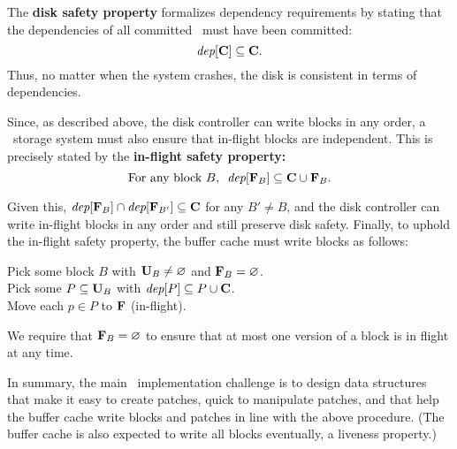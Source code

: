 The \textbf{disk safety property} formalizes dependency requirements by
 stating that the dependencies of all committed \patches\ must have been
 committed:
%
\[ \PDepset{\PDisk} \subseteq \PDisk. \]
%
Thus, no matter when the system crashes, the disk is consistent in terms of
dependencies.
%
%
\begin{comment}
 However, \Kudos\ can only control when \patches\ are handed to the disk
 controller, not when they are written to disk.
 Disk controller behavior is encapsulated in the following atomic action:

 \begin{tabbing}
 \textit{Commit block:} \\
 \quad Pick some block $b$ with $\PInf[b] \neq \emptyset$. \\
 \quad Move each $p \in \PInf[b]$ to $\PDisk$ (committed).
 \end{tabbing}
\end{comment}
%
Since, as described above, the disk controller can write blocks in any
 order, a \Kudos\ storage system must also ensure
that in-flight blocks are independent.  This is precisely stated
by the \textbf{in-flight safety property:}
%
\[ \text{For any block $B$,~~} \PDepset{\PInf[B]} \subseteq \PDisk \cup \PInf[B] . \]
%
\begin{comment}
(The union with $\PInf[B]$ is necessary for the case of multiple in-flight
\patches\ on the same block.)
\end{comment}
%
Given this, $\PDepset{\PInf[B]} \cap \PDepset{\PInf[B']} \subseteq \PDisk$ for
 any $B' \neq B$, and the disk controller can write in-flight blocks
 in any order and still preserve disk safety.
%
Finally, to uphold the in-flight safety property, the buffer cache must
 write blocks as follows:
%
\begin{tabbing}
\quad \quad Pick some block $B$ with $\PMem[B] \neq \emptyset$ and $\PInf[B] =
\emptyset$. \\
\quad \quad Pick some $P \subseteq \PMem[B]$ with $\PDepset{P} \subseteq P \cup
\PDisk$. \\
\quad \quad Move each $p \in P$ to $\PInf$ (in-flight).
\end{tabbing}
%
\noindent
%
We require that $\PInf[B] = \emptyset$ to ensure that at most one version of
 a block is in flight at any time.

In summary, the main \Featherstitch\ implementation challenge is to design
 data structures that make it easy to create patches, quick to manipulate
 patches, and that help the buffer cache write blocks and patches in line
 with the above procedure.
%
(The buffer cache is also expected to write all blocks eventually, a
 liveness property.)


